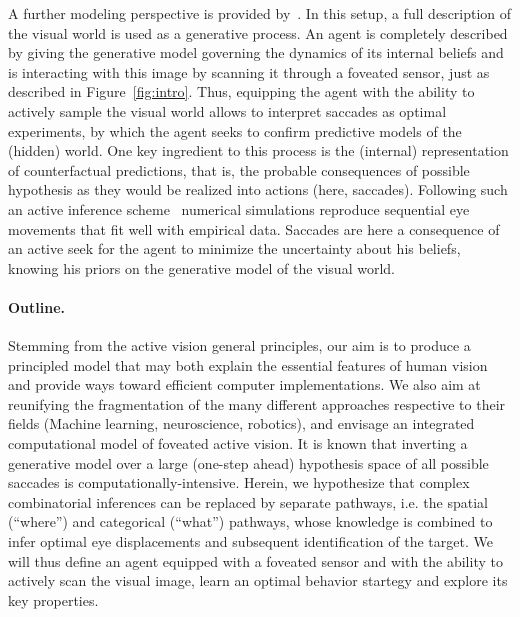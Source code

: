 A further modeling perspective is provided by~\citep{Friston12}. In this setup, a full description of the visual world is used as a generative process. An agent is completely described by giving the generative model governing the dynamics of its internal beliefs and is interacting with this image by scanning it through a foveated sensor, just as described in Figure~\ref{fig:intro}. Thus, equipping the agent with the ability to actively sample the visual world %
allows to interpret saccades as optimal experiments, by which the agent seeks to confirm predictive models of the (hidden) world. One key ingredient to this process is the (internal) representation of counterfactual predictions, that is, the probable consequences of possible hypothesis as they would be realized into actions (here, saccades). Following such an active inference scheme~\citep{Mirza18} numerical simulations reproduce sequential eye movements that fit well with empirical data. %
Saccades %
are here a consequence of an active seek for the agent to minimize the uncertainty about his beliefs, knowing his priors on the generative model of the visual world. 

\paragraph{Outline.}
Stemming from the active vision general principles, our aim is to produce a principled model that may both explain the essential features of human vision and provide ways toward efficient computer implementations. We also aim at reunifying the fragmentation of the many different approaches respective to their fields (Machine learning, neuroscience, robotics), and envisage an integrated computational model of foveated active vision. It is known that inverting a generative model over a large (one-step ahead) hypothesis space of all possible saccades is computationally-intensive. %
Herein, we hypothesize that complex combinatorial inferences can be replaced by separate pathways, i.e. the spatial (``where'') and categorical (``what'') pathways, whose knowledge is combined to infer optimal eye displacements and subsequent identification of the target. 
We will thus define an agent equipped with a foveated sensor and with the ability to actively scan the visual image, %
learn an optimal behavior startegy and explore its key properties.

